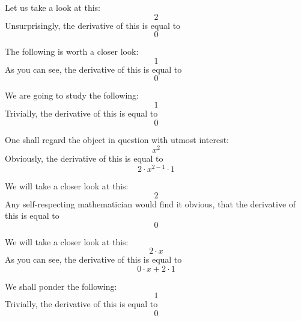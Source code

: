 \documentclass{article}
\begin{document}
Let us take a look at this:
\begin{equation}
2 
\end{equation}
Unsurprisingly, the derivative of this is equal to
\begin{equation}
0 
\end{equation}

The following is worth a closer look:
\begin{equation}
1 
\end{equation}
As you can see, the derivative of this is equal to
\begin{equation}
0 
\end{equation}

We are going to study the following:
\begin{equation}
1 
\end{equation}
Trivially, the derivative of this is equal to
\begin{equation}
0 
\end{equation}

One shall regard the object in question with utmost interest:
\begin{equation}
x ^{2 } 
\end{equation}
Obviously, the derivative of this is equal to
\begin{equation}
2 \cdot x ^{2 - 1 } \cdot 1 
\end{equation}

We will take a closer look at this:
\begin{equation}
2 
\end{equation}
Any self-respecting mathematician would find it obvious, that the derivative of this is equal to
\begin{equation}
0 
\end{equation}

We will take a closer look at this:
\begin{equation}
2 \cdot x 
\end{equation}
As you can see, the derivative of this is equal to
\begin{equation}
0 \cdot x + 2 \cdot 1 
\end{equation}

We shall ponder the following:
\begin{equation}
1 
\end{equation}
Trivially, the derivative of this is equal to
\begin{equation}
0 
\end{equation}
\end{document}
